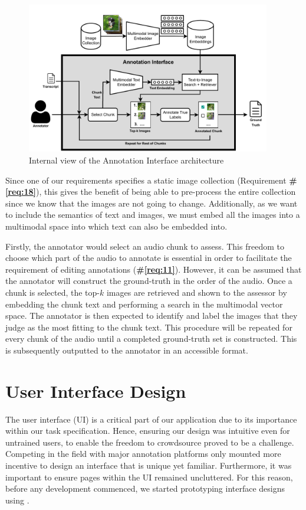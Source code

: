 \documentclass{l4proj}
\begin{document}
\begin{figure}[h]
    \centering
    \includegraphics[width=0.95\textwidth]{figures/annotation_interface.pdf}
    \caption{Internal view of the Annotation Interface architecture}
    \label{fig:annotation_interface}
\end{figure}

Since one of our requirements specifies a static image collection (Requirement \textbf{\#\ref{req:18}}), this gives the benefit of being able to pre-process the entire collection since we know that the images are not going to change. Additionally, as we want to include the semantics of text and images, we must embed all the images into a multimodal space into which text can also be embedded into.

Firstly, the annotator would select an audio chunk to assess. This freedom to choose which part of the audio to annotate is essential in order to facilitate the requirement of editing annotations (\textbf{\#\ref{req:11}}). However, it can be assumed that the annotator will construct the ground-truth in the order of the audio. Once a chunk is selected, the top-$k$ images are retrieved and shown to the assessor by embedding the chunk text and performing a search in the multimodal vector space. The annotator is then expected to identify and label the images that they judge as the most fitting to the chunk text. This procedure will be repeated for every chunk of the audio until a completed ground-truth set is constructed. This is subsequently outputted to the annotator in an accessible format.


\section{User Interface Design}
The user interface (UI) is a critical part of our application due to its importance within our task specification. Hence, ensuring our design was intuitive even for untrained users, to enable the freedom to crowdsource proved to be a challenge. Competing in the field with major annotation platforms only mounted more incentive to design an interface that is unique yet familiar. Furthermore, it was important to ensure pages within the UI remained uncluttered. For this reason, before any development commenced, we started prototyping interface designs using \cite{figma}.
\end{document}
